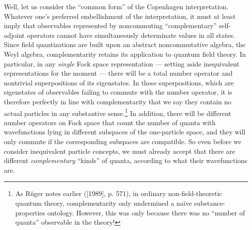 \documentclass[12pt]{article}
\theoremstyle{remark}
\theoremstyle{definition}
\begin{document}
\noindent Well, let us consider the ``common form'' of the Copenhagen interpretation.  
Whatever one's preferred embellishment of the interpretation, it must
at least imply that observables represented by noncommuting
``complementary'' self-adjoint operators cannot have simultaneously
determinate values in all states.  Since field quantizations are built
upon an abstract noncommutative algebra, the Weyl algebra,
complementarity retains its application to quantum field theory.  In
particular, in any \emph{single} Fock space representation --- setting
aside inequivalent representations for the moment --- there will be a
total number operator and nontrivial superpositions of its
eigenstates. In these superpositions, which are eigenstates of
observables failing to commute with the number operator, it is
therefore perfectly in line with complementarity that we say they
contain no actual particles in any substantive sense.\footnote{As
  R\"{u}ger notes earlier ([1989], p. 571), in ordinary
  non-field-theoretic quantum theory, complementarity only undermined
  a na\"{i}ve substance-properties ontology.  However, this was only
  because there was no ``number of quanta'' observable in the theory!}
In addition, there will be different number operators on Fock space
that count the number of quanta with wavefunctions lying in different
subspaces of the one-particle space, and they will only commute if the
corresponding subspaces are compatible.  So even before we consider
inequivalent particle concepts, we must already accept that there are
different \emph{complementary} ``kinds'' of quanta, according to what
their wavefunctions are.
\end{document}
